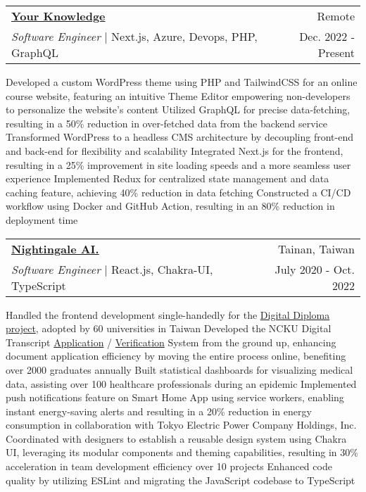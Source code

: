 \newcommand{\resumeExpEntry}[5]{
  \vspace{5pt}\item
    \begin{tabular*}{0.97\textwidth}{l@{\extracolsep{\fill}}r}
      \textbf{#1} & \small #2 \\
      \textit{#3} | #4 & \small #5 \\
    \end{tabular*}\vspace{-5pt}
}

\resumeExpEntry
{\href{https://yourknowledge.online}{Your Knowledge}}
{Remote}
{Software Engineer}
{Next.js, Azure, Devops, PHP, GraphQL}
{Dec. 2022 - Present}
{
  \resumeItemListStart
    \resumeItem
    {Developed a custom WordPress theme using PHP and TailwindCSS for an online course website, featuring an intuitive Theme Editor empowering non-developers to personalize the website's content}
    \resumeItem
    {Utilized GraphQL for precise data-fetching, resulting in a 50\% reduction in over-fetched data from the backend service}
    \resumeItem
    {Transformed WordPress to a headless CMS architecture by decoupling front-end and back-end for flexibility and scalability}
    \resumeItem
    {Integrated Next.js for the frontend, resulting in a 25\% improvement in site loading speeds and a more seamless user experience}
    \resumeItem
    {Implemented Redux for centralized state management and data caching feature, achieving 40\% reduction in data fetching}
    \resumeItem
    {Constructed a CI/CD workflow using Docker and GitHub Action, resulting in an 80\% reduction in deployment time}
  \resumeItemListEnd
}

\resumeExpEntry
{\href{https://19gale.ai}{Nightingale AI.}}
{Tainan, Taiwan}
{Software Engineer}
{React.js, Chakra-UI, TypeScript}
{July 2020 - Oct. 2022}
{
  \resumeItemListStart
    \resumeItem
    {Handled the frontend development single-handedly for the \href{https://dcert.moe.gov.tw}{Digital Diploma project}, adopted by 60 universities in Taiwan}
    \resumeItem
    {Developed the NCKU Digital Transcript \href{https://stuapply.diploma.ncku.edu.tw/release}{Application} / \href{https://stuapply.diploma.ncku.edu.tw/verify}{Verification} System from the ground up, enhancing document application efficiency by moving the entire process online, benefiting over 2000 graduates annually}
    \resumeItem
    {Built statistical dashboards for visualizing medical data, assisting over 100 healthcare professionals during an epidemic}
    \resumeItem
    {Implemented push notifications feature on Smart Home App using service workers, enabling instant energy-saving alerts and resulting in a 20\% reduction in energy consumption in collaboration with Tokyo Electric Power Company Holdings, Inc.}
    \resumeItem
    {Coordinated with designers to establish a reusable design system using Chakra UI, leveraging its modular components and theming capabilities, resulting in 30\% acceleration in team development efficiency over 10 projects}
    \resumeItem
    {Enhanced code quality by utilizing ESLint and migrating the JavaScript codebase to TypeScript}
  \resumeItemListEnd
}

